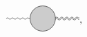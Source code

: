 \begin{equation}
\begin{gathered}
\begin{tikzpicture}[x=0.75pt,y=0.75pt,yscale=-0.7,xscale=0.7]
            \draw    (67,120) .. controls (68.67,118.33) and (70.33,118.33) .. (72,120) .. controls (73.67,121.67) and (75.33,121.67) .. (77,120) .. controls (78.67,118.33) and (80.33,118.33) .. (82,120) .. controls (83.67,121.67) and (85.33,121.67) .. (87,120) .. controls (88.67,118.33) and (90.33,118.33) .. (92,120) .. controls (93.67,121.67) and (95.33,121.67) .. (97,120) .. controls (98.67,118.33) and (100.33,118.33) .. (102,120) .. controls (103.67,121.67) and (105.33,121.67) .. (107,120) .. controls (108.67,118.33) and (110.33,118.33) .. (112,120) -- (114,120) -- (114,120) ;
            \draw  [fill={rgb, 255:red, 155; green, 155; blue, 155 }  ,fill opacity=0.5 ] (114,120) .. controls (114,106.19) and (125.19,95) .. (139,95) .. controls (152.81,95) and (164,106.19) .. (164,120) .. controls (164,133.81) and (152.81,145) .. (139,145) .. controls (125.19,145) and (114,133.81) .. (114,120) -- cycle ;
            \draw    (164,118.5) .. controls (165.67,116.83) and (167.33,116.83) .. (169,118.5) .. controls (170.67,120.17) and (172.33,120.17) .. (174,118.5) .. controls (175.67,116.83) and (177.33,116.83) .. (179,118.5) .. controls (180.67,120.17) and (182.33,120.17) .. (184,118.5) .. controls (185.67,116.83) and (187.33,116.83) .. (189,118.5) .. controls (190.67,120.17) and (192.33,120.17) .. (194,118.5) .. controls (195.67,116.83) and (197.33,116.83) .. (199,118.5) .. controls (200.67,120.17) and (202.33,120.17) .. (204,118.5) .. controls (205.67,116.83) and (207.33,116.83) .. (209,118.5) -- (211,118.5) -- (211,118.5)(164,121.5) .. controls (165.67,119.83) and (167.33,119.83) .. (169,121.5) .. controls (170.67,123.17) and (172.33,123.17) .. (174,121.5) .. controls (175.67,119.83) and (177.33,119.83) .. (179,121.5) .. controls (180.67,123.17) and (182.33,123.17) .. (184,121.5) .. controls (185.67,119.83) and (187.33,119.83) .. (189,121.5) .. controls (190.67,123.17) and (192.33,123.17) .. (194,121.5) .. controls (195.67,119.83) and (197.33,119.83) .. (199,121.5) .. controls (200.67,123.17) and (202.33,123.17) .. (204,121.5) .. controls (205.67,119.83) and (207.33,119.83) .. (209,121.5) -- (211,121.5) -- (211,121.5) ;
            \end{tikzpicture}
    \end{gathered} ,
\end{equation}